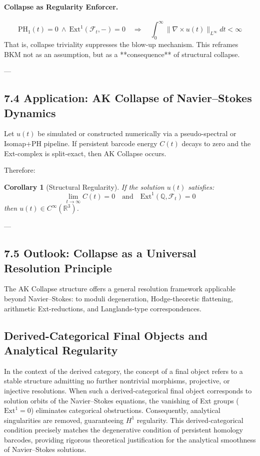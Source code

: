 \documentclass[11pt]{article}
\newtheorem{corollary}[theorem]{Corollary}
\theoremstyle{definition}
\begin{document}
\paragraph{Collapse as Regularity Enforcer.}
\[
\mathrm{PH}_1(t) = 0 \ \wedge \ \mathrm{Ext}^1(\mathcal{F}_t,-) = 0 \quad \Rightarrow \quad \int_0^\infty \|\nabla \times u(t)\|_{L^\infty} dt < \infty
\]
That is, collapse triviality suppresses the blow-up mechanism. This reframes BKM not as an assumption,  
but as a **consequence** of structural collapse.


---

\subsection*{7.4 Application: AK Collapse of Navier–Stokes Dynamics}

Let $u(t)$ be simulated or constructed numerically via a pseudo-spectral or Isomap+PH pipeline.  
If persistent barcode energy $C(t)$ decays to zero and the Ext-complex is split-exact, then AK Collapse occurs.

Therefore:

\begin{corollary}[Structural Regularity]
If the solution $u(t)$ satisfies:
\[
\lim_{t \to \infty} C(t) = 0 \quad \text{and} \quad \mathrm{Ext}^1(\mathbb{Q}, \mathcal{F}_t) = 0
\]
then $u(t) \in C^\infty(\mathbb{R}^3)$.
\end{corollary}

---

\subsection*{7.5 Outlook: Collapse as a Universal Resolution Principle}

The AK Collapse structure offers a general resolution framework applicable beyond Navier–Stokes:  
to moduli degeneration, Hodge-theoretic flattening, arithmetic Ext-reductions, and Langlands-type correspondences.

\subsection{Derived-Categorical Final Objects and Analytical Regularity}

In the context of the derived category, the concept of a final object refers to a stable structure admitting no further nontrivial morphisms, projective, or injective resolutions. When such a derived-categorical final object corresponds to solution orbits of the Navier–Stokes equations, the vanishing of Ext groups ($\mathrm{Ext}^1=0$) eliminates categorical obstructions. Consequently, analytical singularities are removed, guaranteeing $H^1$ regularity. This derived-categorical condition precisely matches the degenerative condition of persistent homology barcodes, providing rigorous theoretical justification for the analytical smoothness of Navier–Stokes solutions.
\end{document}
